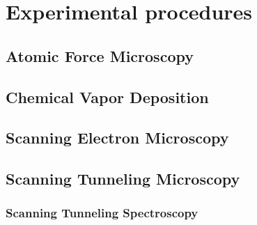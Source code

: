 \documentclass[10pt,a4paper,twoside
,BCOR=8mm				%
,headings=normal		%
,headsepline			%
,footsepline			%
,plainfootsepline		%
]{scrbook}
\begin{document}
 \frontmatter{}			 														%
 \setcounter{tocdepth}{1}														%
	\tableofcontents{}														 	%
 	\listoffigures														 		%
 	\listoftables																%

\mainmatter{}
\chapter{Experimental procedures}
  \section{\textbf{A}tomic \textbf{F}orce \textbf{M}icroscopy}
     
  \section{\textbf{C}hemical \textbf{V}apor \textbf{D}eposition}
	 
  \section{\textbf{S}canning \textbf{E}lectron \textbf{M}icroscopy}
	 
  \section{\textbf{S}canning \textbf{T}unneling \textbf{M}icroscopy}
     
     \subsection{\textbf{S}canning \textbf{T}unneling \textbf{S}pectroscopy}
 	 	
\end{document}
